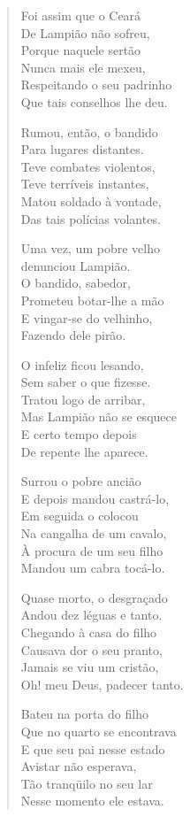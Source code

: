 \begin{verse}
Foi assim que o Ceará\\
De Lampião não sofreu,\\
Porque naquele sertão\\
Nunca mais ele mexeu,\\
Respeitando o seu padrinho\\
Que tais conselhos lhe deu.
\pagebreak

Rumou, então, o bandido\\
Para lugares distantes.\\
Teve combates violentos,\\
Teve terríveis instantes,\\
Matou soldado à vontade,\\
Das tais polícias volantes.

Uma vez, um pobre velho\\
denunciou Lampião.\\
O bandido, sabedor,\\
Prometeu botar-lhe a mão\\
E vingar-se do velhinho,\\
Fazendo dele pirão.

O infeliz ficou lesando,\\
Sem saber o que fizesse.\\
Tratou logo de arribar,\\
Mas Lampião não se esquece\\
E certo tempo depois\\
De repente lhe aparece.

Surrou o pobre ancião\\
E depois mandou castrá-lo,\\
Em seguida o colocou\\
Na cangalha de um cavalo,\\
À procura de um seu filho\\
Mandou um cabra tocá-lo.
\pagebreak

Quase morto, o desgraçado\\
Andou dez léguas e tanto.\\
Chegando à casa do filho\\
Causava dor o seu pranto,\\
Jamais se viu um cristão,\\
Oh! meu Deus, padecer tanto.

Bateu na porta do filho\\
Que no quarto se encontrava\\
E que seu pai nesse estado\\
Avistar não esperava,\\
Tão tranqüilo no seu lar\\
Nesse momento ele estava.


\end{verse}
